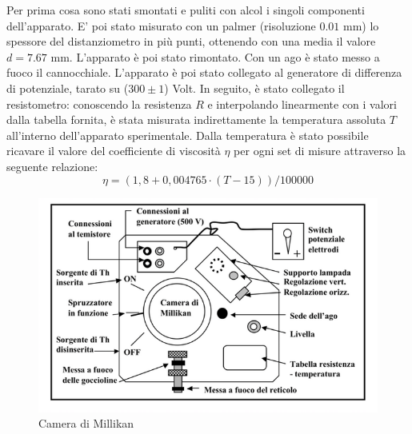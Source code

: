 \documentclass{article}
\begin{document}
        Per prima cosa sono stati smontati e puliti con alcol i singoli componenti dell'apparato. E' poi stato misurato con un palmer (risoluzione $0.01$ mm) lo spessore del distanziometro in più punti, ottenendo con una media il valore $d=7.67$ mm. L'apparato è poi stato rimontato. Con un ago è stato messo a fuoco il cannocchiale. 
        L'apparato è poi stato collegato al generatore di differenza di potenziale, tarato su ($300 \pm 1$) Volt. In seguito, è stato collegato il resistometro: conoscendo la resistenza $R$ e interpolando linearmente con i valori dalla tabella fornita, è stata misurata indirettamente la temperatura assoluta $T$ all'interno dell'apparato sperimentale. Dalla temperatura è stato possibile ricavare il valore del coefficiente di viscosità $\eta$ per ogni set di misure attraverso la seguente relazione:\\
        \[ \eta = (1,8 + 0,004765 \cdot (T - 15)) / 100000 \]

        \begin{figure}[H]
            \centering
            \includegraphics[width=0.9\linewidth]{../images/camera.png}
            \caption{Camera di Millikan}
            \label{fig:camera_millikan}
        \end{figure}
        
\end{document}

